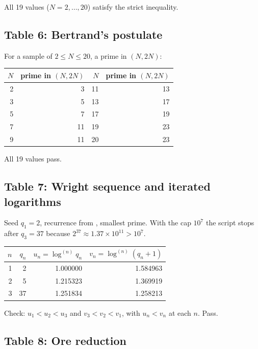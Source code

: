 \documentclass[11pt,reqno]{amsart}
\theoremstyle{redplain}
\numberwithin{equation}{section}
\begin{document}
All 19 values ($N=2,\dots,20$) satisfy the strict inequality.

\subsection{Table 6: Bertrand's postulate}

For a sample of $2\le N\le20$, a prime in $(N,2N)$:

\begin{center}
\begin{tabular}{rr|rr}
\toprule
$N$ & prime in $(N,2N)$ & $N$ & prime in $(N,2N)$\\
\midrule
2  & 3  & 11 & 13 \\
3  & 5  & 13 & 17 \\
5  & 7  & 17 & 19 \\
7  & 11 & 19 & 23 \\
9  & 11 & 20 & 23 \\
\bottomrule
\end{tabular}
\end{center}

All 19 values pass.

\subsection{Table 7: Wright sequence and iterated logarithms}

Seed $q_1=2$, recurrence from , smallest prime. With the
cap $10^7$ the script stops after $q_3=37$ because
$2^{37}\approx1.37\times10^{11}>10^7$.

\begin{center}
\begin{tabular}{rrrr}
\toprule
$n$ & $q_n$ & $u_n=\log^{(n)}q_n$ & $v_n=\log^{(n)}(q_n+1)$\\
\midrule
1 & 2  & 1.000000 & 1.584963 \\
2 & 5  & 1.215323 & 1.369919 \\
3 & 37 & 1.251834 & 1.258213 \\
\bottomrule
\end{tabular}
\end{center}

Check: $u_1<u_2<u_3$ and $v_3<v_2<v_1$, with $u_n<v_n$ at each $n$.
Pass.

\subsection{Table 8: Ore reduction}
\end{document}
